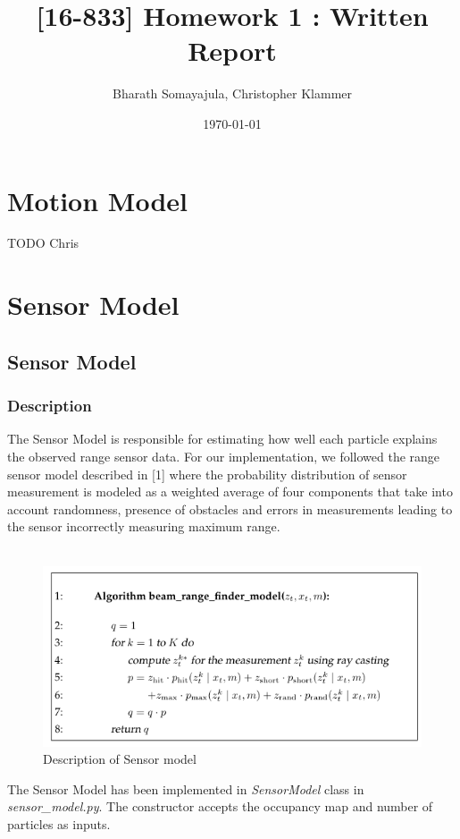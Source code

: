 \documentclass[12pt, a4paper]{article}
\title{[16-833] Homework 1 : Written Report}
\author{Bharath Somayajula, Christopher Klammer}
\date{\today}
\begin{document}
\maketitle

\tableofcontents

\section{Motion Model}
TODO Chris
\section{Sensor Model}
\subsection{Sensor Model}
\subsubsection{Description}
The Sensor Model is responsible for estimating how well each particle explains the observed range sensor data. For our implementation, we followed the range sensor model described in [1] where the probability distribution of sensor measurement is modeled as a weighted average of four components that take into account randomness, presence of obstacles and errors in measurements leading to the sensor incorrectly measuring maximum range. \\\\
\begin{figure}[H]
  \centering
  \includegraphics[width=0.9\linewidth]{results/sensor_model_desc.png}
  \caption{Description of Sensor model}
\end{figure}
The Sensor Model has been implemented in \textit{SensorModel} class in \textit{sensor\_model.py}. The constructor accepts the occupancy map and number of particles as inputs.\\\\
\end{document}
